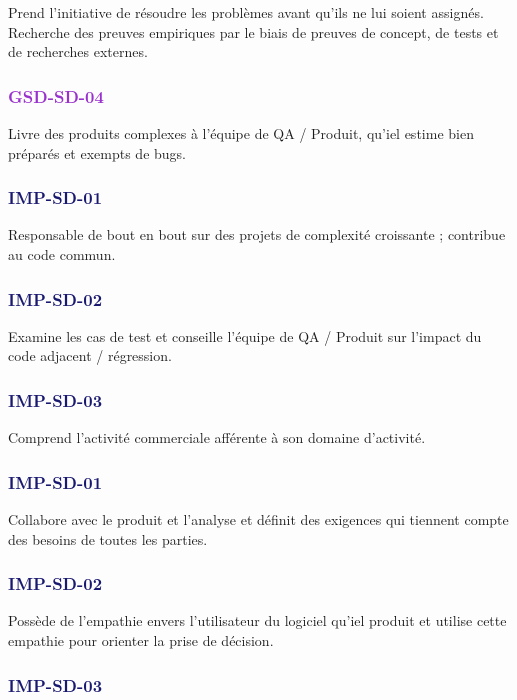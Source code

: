 \documentclass[a4paper, french, openany, 12pt]{book}
\newcommand\str[1]{\textcolor{DarkOrchid}{\textbf{\uppercase{gsd-{#1}}}}}
\newcommand\wis[1]{\textcolor{MidnightBlue}{\textbf{\uppercase{imp-{#1}}}}}
\begin{document}
\begin{multicols}{2}
  Prend l'initiative de résoudre les problèmes avant qu'ils ne lui soient assignés. 
  Recherche des preuves empiriques par le biais de preuves de concept, de tests et de recherches externes.

  \subsubsection*{\str{sd-04}}

  Livre des produits complexes à l'équipe de QA / Produit, qu'iel estime bien préparés et exempts de bugs.

  \subsubsection*{\wis{sd-01}}

  Responsable de bout en bout sur des projets de complexité croissante ; contribue au code commun.

  \subsubsection*{\wis{sd-02}}

  Examine les cas de test et conseille l'équipe de QA / Produit sur l'impact du code adjacent / régression.

  \subsubsection*{\wis{sd-03}}

  Comprend l'activité commerciale afférente à son domaine d'activité.

  \subsubsection*{\wis{sd-01}}

  Collabore avec le produit et l'analyse et définit des exigences qui tiennent compte des besoins de toutes les parties.

  \subsubsection*{\wis{sd-02}}

  Possède de l'empathie envers l'utilisateur du logiciel qu'iel produit et utilise cette empathie pour orienter la prise 
  de décision.

  \subsubsection*{\wis{sd-03}}


\end{multicols}
\end{document}
